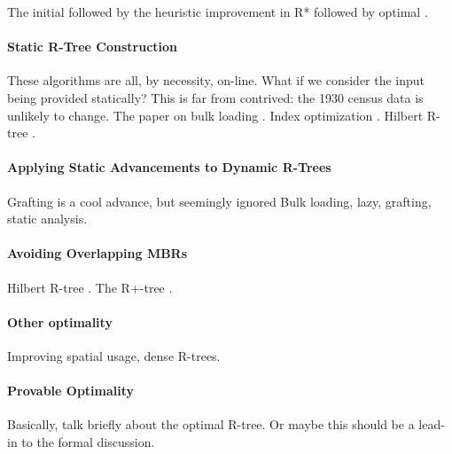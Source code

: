 The initial \cite{guttman84} followed by the heuristic improvement in R* \cite{beckmannkriegelschneiderseeger90} followed by optimal \cite{garcialopezleutenegger98}.

\paragraph{Static R-Tree Construction}
These algorithms are all, by necessity, on-line.
What if we consider the input being provided statically?
This is far from contrived: the 1930 census data is unlikely to change.
The paper on bulk loading \cite{garcialopezleutenegger98a}.
Index optimization \cite{gavrila94}.
Hilbert R-tree \cite{kamelfaloutsos94}.


\paragraph{Applying Static Advancements to Dynamic R-Trees}
Grafting is a cool advance, but seemingly ignored
Bulk loading, lazy, grafting, static analysis.


\paragraph{Avoiding Overlapping MBRs}
Hilbert R-tree \cite{kamelfaloutsos94}.
The R+-tree \cite{sellisroussopoulosfaloutsos87}.

\paragraph{Other optimality}
Improving spatial usage, dense R-trees.

\paragraph{Provable Optimality}
Basically, talk briefly about the optimal R-tree.
Or maybe this should be a lead-in to the formal discussion.
